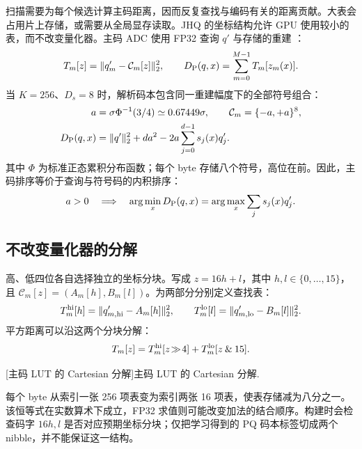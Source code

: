 扫描需要为每个候选计算主码距离，因而反复查找与编码有关的距离贡献。大表会占用片上存储，或需要从全局显存读取。JHQ 的坐标结构允许 GPU 使用较小的表，而不改变量化器。主码 ADC 使用 FP32 查询 $q'$ 与存储的重建 \cite{pq,jhq}：
\begin{equation}
 T_m[z]=\|q'_m-\mathcal C_m[z]\|_2^2,\qquad
 D_{\mathrm{P}}(q,x)=\sum_{m=0}^{M-1}T_m[z_m(x)].
 \label{eq:5-primary-lut}
\end{equation}
当 $K=256$、$D_s=8$ 时，解析码本包含同一重建幅度下的全部符号组合：
\begin{equation}
 \begin{aligned}
 a&=\sigma\Phi^{-1}(3/4)\simeq0.67449\sigma,\qquad
 \mathcal C_m=\{-a,+a\}^{8},\\
 D_{\mathrm{P}}(q,x)&=\|q'\|_2^2+da^2
       -2a\sum_{j=0}^{d-1}s_j(x)q'_j.
 \end{aligned}
 \label{eq:5-sign-codebook}
\end{equation}
其中 $\Phi$ 为标准正态累积分布函数；每个 byte 存储八个符号，高位在前。因此，主码排序等价于查询与符号码的内积排序：
\[
 a>0\quad\Longrightarrow\quad
 \arg\min_xD_{\mathrm{P}}(q,x)=\arg\max_x\sum_j s_j(x)q'_j.
\]

\subsection{不改变量化器的分解}

高、低四位各自选择独立的坐标分块。写成 $z=16h+l$，其中 $h,l\in\{0,\ldots,15\}$，且 $\mathcal C_m[z]=(A_m[h],B_m[l])$。为两部分分别定义查找表：
\begin{equation}
 T_m^{\rm hi}[h]=\|q'_{m,\rm hi}-A_m[h]\|_2^2,\qquad
 T_m^{\rm lo}[l]=\|q'_{m,\rm lo}-B_m[l]\|_2^2.
 \label{eq:5-lut-halves}
\end{equation}
平方距离可以沿这两个分块分解：
\begin{equation}
 T_m[z]=T_m^{\rm hi}[z\!\gg\!4]
        +T_m^{\rm lo}[z\mathbin{\&}15].
 \label{eq:5-lut-factorisation}
\end{equation}
\par\medskip\noindent\begin{minipage}{\linewidth}
\captionsetup{hypcap=false}
\centering

[主码 LUT 的 Cartesian 分解]{主码 LUT 的 Cartesian 分解.}
\label{fig:5-cartesian-lut}
\end{minipage}\par\medskip
每个 byte 从索引一张 256 项表变为索引两张 16 项表，使表存储减为八分之一。该恒等式在实数算术下成立，FP32 求值则可能改变加法的结合顺序。构建时会检查码字 $16h,l$ 是否对应预期坐标分块；仅把学习得到的 PQ 码本标签切成两个 nibble，并不能保证这一结构。

